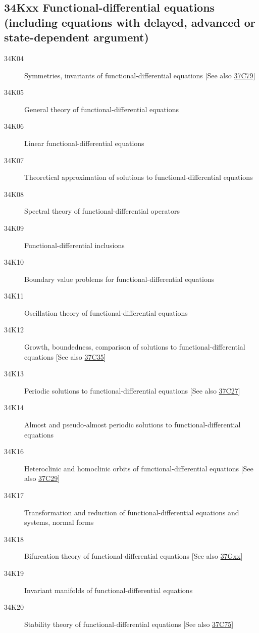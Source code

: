 \documentclass[letterpaper]{article}
\begin{document}
\subsection*{34Kxx  Functional-differential equations (including equations with delayed, advanced or state-dependent argument) }\label{34Kxx}
\begin{description}  
\item [34K04]\label{34K04} Symmetries, invariants of functional-differential equations [See also \hyperref[37C79]{37C79}]
\item [34K05]\label{34K05} General theory of functional-differential equations
\item [34K06]\label{34K06} Linear functional-differential equations
\item [34K07]\label{34K07} Theoretical approximation of solutions to functional-differential equations
\item [34K08]\label{34K08} Spectral theory of functional-differential operators
\item [34K09]\label{34K09} Functional-differential inclusions
\item [34K10]\label{34K10} Boundary value problems for functional-differential equations
\item [34K11]\label{34K11} Oscillation theory of functional-differential equations
\item [34K12]\label{34K12} Growth, boundedness, comparison of solutions to functional-differential equations [See also \hyperref[37C35]{37C35}]
\item [34K13]\label{34K13} Periodic solutions to functional-differential equations [See also \hyperref[37C27]{37C27}]
\item [34K14]\label{34K14} Almost and pseudo-almost periodic solutions to functional-differential equations
\item [34K16]\label{34K16} Heteroclinic and homoclinic orbits of functional-differential equations [See also \hyperref[37C29]{37C29}]
\item [34K17]\label{34K17} Transformation and reduction of functional-differential equations and systems, normal forms
\item [34K18]\label{34K18} Bifurcation theory of functional-differential equations [See also \hyperref[37Gxx]{37Gxx}]
\item [34K19]\label{34K19} Invariant manifolds of functional-differential equations
\item [34K20]\label{34K20} Stability theory of functional-differential equations [See also \hyperref[37C75]{37C75}]

\end{description}
\end{document}
